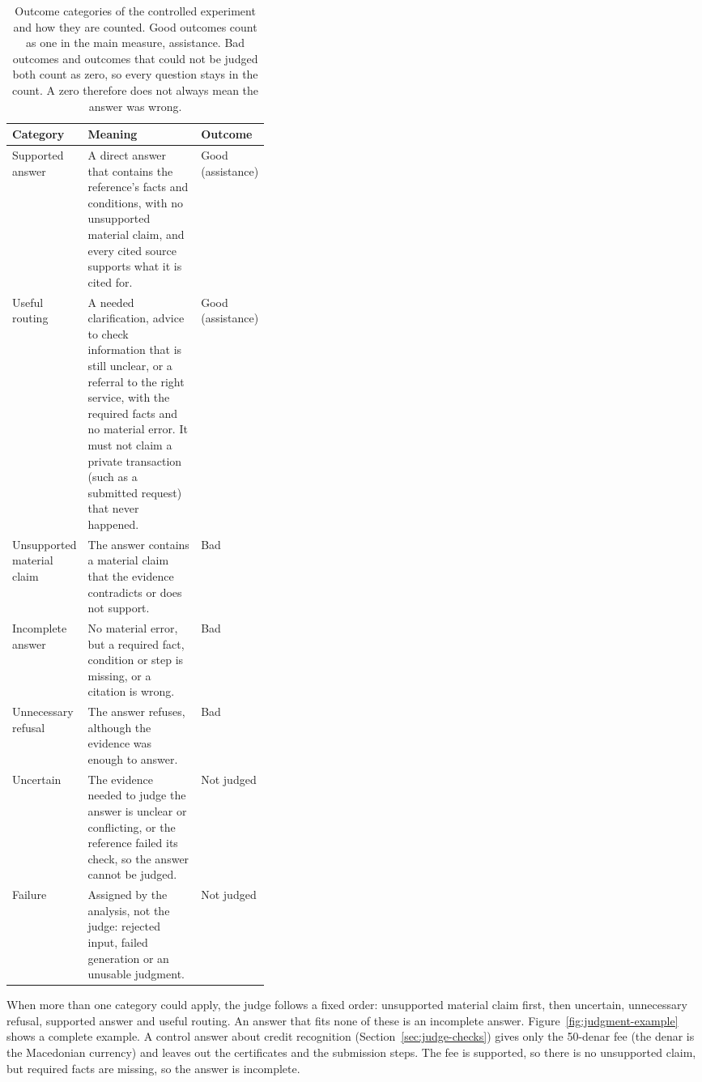 \begin{table}[htbp]
\centering
\caption[Outcome categories of the controlled experiment and how they are counted]{Outcome categories of the controlled experiment and how they are counted. Good outcomes count as one in the main measure, assistance. Bad outcomes and outcomes that could not be judged both count as zero, so every question stays in the count. A zero therefore does not always mean the answer was wrong.}
\label{tab:categories}
\small
\begin{tabularx}{\linewidth}{@{}>{\raggedright\arraybackslash}p{0.2\linewidth}>{\raggedright\arraybackslash}X>{\raggedright\arraybackslash}p{0.17\linewidth}@{}}
\toprule
Category & Meaning & Outcome \\
\midrule
Supported answer & A direct answer that contains the reference's facts and conditions, with no unsupported material claim, and every cited source supports what it is cited for. & Good (assistance) \\
Useful routing & A needed clarification, advice to check information that is still unclear, or a referral to the right service, with the required facts and no material error. It must not claim a private transaction (such as a submitted request) that never happened. & Good (assistance) \\
Unsupported material claim & The answer contains a material claim that the evidence contradicts or does not support. & Bad \\
Incomplete answer & No material error, but a required fact, condition or step is missing, or a citation is wrong. & Bad \\
Unnecessary refusal & The answer refuses, although the evidence was enough to answer. & Bad \\
Uncertain & The evidence needed to judge the answer is unclear or conflicting, or the reference failed its check, so the answer cannot be judged. & Not judged \\
Failure & Assigned by the analysis, not the judge: rejected input, failed generation or an unusable judgment. & Not judged \\
\bottomrule
\end{tabularx}
\end{table}

When more than one category could apply, the judge follows a fixed order: unsupported material claim first, then uncertain, unnecessary refusal, supported answer and useful routing. An answer that fits none of these is an incomplete answer. Figure~\ref{fig:judgment-example} shows a complete example. A control answer about credit recognition (Section~\ref{sec:judge-checks}) gives only the 50-denar fee (the denar is the Macedonian currency) and leaves out the certificates and the submission steps. The fee is supported, so there is no unsupported claim, but required facts are missing, so the answer is incomplete.

